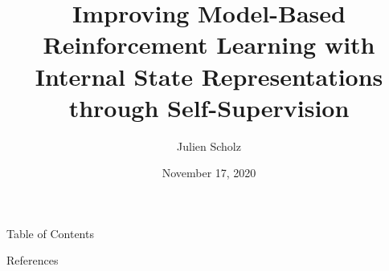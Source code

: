 \documentclass{beamer}
\title{Improving Model-Based Reinforcement Learning with Internal State Representations through Self-Supervision}
\author{Julien Scholz}
\date{November 17, 2020}
\institute{Supervised by Dr. Cornelius Weber and Burhan Hafez}
\begin{document}
\frame{\titlepage}



\begin{frame}{Table of Contents}
  \tableofcontents
\end{frame}






\begin{frame}[allowframebreaks]{References}


\end{frame}


\end{document}
